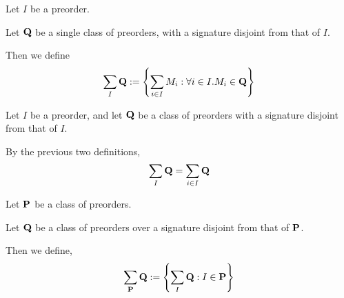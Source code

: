 \begin{definition}
  Let $I$ be a preorder.

  Let $\mathbf{Q}$ be a single class of preorders,
  with a signature disjoint from that of $I$.

  Then we define
  \[
    \sum_{I}{\mathbf{Q}} := \left\{ {\sum_{i \in I}{M_i} : \forall i \in I. M_i \in \mathbf{Q}} \right\}
  \]
\end{definition}

\begin{note}
  Let $I$ be a preorder, and let $\mathbf{Q}$ be a class of preorders
  with a signature disjoint from that of $I$.

  By the previous two definitions,
  \[
    \sum_{I}{\mathbf{Q}} = \sum_{i \in I}{\mathbf{Q}}
  \]
\end{note}

\begin{definition}
  Let $\mathbf{P}$ be a class of preorders.

  Let $\mathbf{Q}$ be a class of preorders over a signature disjoint from that of $\mathbf{P}$.

  Then we define,
  \[
    \sum_{\mathbf{P}}{\mathbf{Q}} := \left\{ {\sum_{I}{\mathbf{Q}} : I \in \mathbf{P}} \right\}
  \]
\end{definition}
